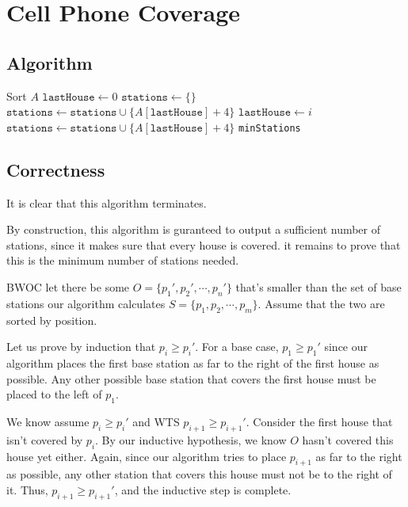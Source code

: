 \documentclass[12pt]{article}
\begin{document}
\section{Cell Phone Coverage}

\subsection{Algorithm}

\begin{algorithmic}[1]
    \State Sort $A$
    \State $\texttt{lastHouse} \gets 0$
    \State $\texttt{stations} \gets \{\}$
        \State $\texttt{stations} \gets \texttt{stations} \cup \{A[\texttt{lastHouse}] + 4\}$
        \State $\texttt{lastHouse} \gets i$
        \EndIf
    \EndFor
    \State $\texttt{stations} \gets \texttt{stations} \cup \{A[\texttt{lastHouse}] + 4\}$
    \State \Return \texttt{minStations}
\end{algorithmic}

\subsection{Correctness}

It is clear that this algorithm terminates.

By construction, this algorithm is guranteed to output a sufficient number
of stations, since it makes sure that every house is covered.
it remains to prove that this is the minimum number of stations needed.

BWOC let there be some $O=\{p_1', p_2', \cdots, p_n'\}$ that's smaller
than the set of base stations our algorithm calculates $S=\{p_1, p_2, \cdots, p_m\}$.
Assume that the two are sorted by position.

Let us prove by induction that $p_i \ge p_i'$.
For a base case, $p_1 \ge p_1'$ since our algorithm
places the first base station as far to the right of the first house as possible.
Any other possible base station that covers the first house
must be placed to the left of $p_1$.

We know assume $p_i \ge p_i'$ and WTS $p_{i+1} \ge p_{i+1}'$.
Consider the first house that isn't covered by $p_i$.
By our inductive hypothesis, we know $O$ hasn't covered this house yet either.
Again, since our algorithm tries to place $p_{i+1}$ as far to the right as possible,
any other station that covers this house must not be to the right of it.
Thus, $p_{i+1} \ge p_{i+1}'$, and the inductive step is complete.
\end{document}
